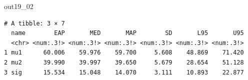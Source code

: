 \begin{MCMCout}{}{out19_02}
	\begin{verbatim}
# A tibble: 3 × 7
  name        EAP       MED       MAP        SD       L95       U95
  <chr> <num:.3!> <num:.3!> <num:.3!> <num:.3!> <num:.3!> <num:.3!>
1 mu1      60.006    59.976    59.700     5.608    48.869    71.420
2 mu2      39.990    39.997    39.650     5.679    28.654    51.128
3 sig      15.534    15.048    14.070     3.111    10.893    22.877
\end{verbatim}
\end{MCMCout}
